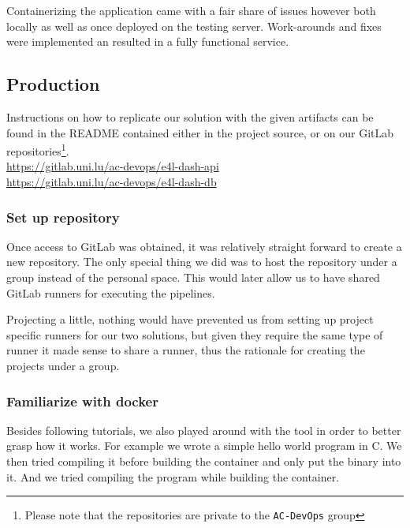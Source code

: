Containerizing the application came with a fair share of issues
however both locally as well as once deployed on the testing server.
Work-arounds and fixes were implemented an resulted in a fully
functional service.


\subsection{Production}




Instructions on how to replicate our solution with the given artifacts
can be found in the README contained either in the project source, or
on our GitLab repositories\footnote{Please note that the repositories
are private to the \texttt{AC-DevOps} group}.
\\\url{https://gitlab.uni.lu/ac-devops/e4l-dash-api}
\\\url{https://gitlab.uni.lu/ac-devops/e4l-dash-db}

\subsubsection{Set up repository}

Once access to GitLab was obtained, it was relatively straight forward
to create a new repository. The only special thing we did was to host
the repository under a group instead of the personal space. This would
later allow us to have shared GitLab runners for executing the
pipelines.

Projecting a little, nothing would have prevented us from setting up
project specific runners for our two solutions, but given they require
the same type of runner it made sense to share a runner, thus the
rationale for creating the projects under a group.

\subsubsection{Familiarize with docker}

Besides following tutorials, we also played around with the tool in
order to better grasp how it works. For example we wrote a simple
hello world program in C. We then tried compiling it before building
the container and only put the binary into it. And we tried compiling
the program while building the container.

